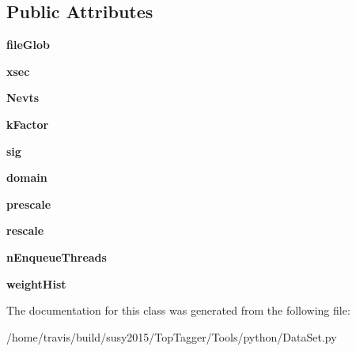 \subsection*{Public Attributes}
\begin{DoxyCompactItemize}
\item 
\hypertarget{classDataSet_1_1DataSet_a31312e7ebc75a63846784ead3f5cf8d1}{{\bfseries file\-Glob}}\label{classDataSet_1_1DataSet_a31312e7ebc75a63846784ead3f5cf8d1}

\item 
\hypertarget{classDataSet_1_1DataSet_ada08c6b544a58467403e9ab421057b5f}{{\bfseries xsec}}\label{classDataSet_1_1DataSet_ada08c6b544a58467403e9ab421057b5f}

\item 
\hypertarget{classDataSet_1_1DataSet_a69beaca98bb3ebb6061af614c70c5a80}{{\bfseries Nevts}}\label{classDataSet_1_1DataSet_a69beaca98bb3ebb6061af614c70c5a80}

\item 
\hypertarget{classDataSet_1_1DataSet_a6813ebb37a959a59becf21a06fda7e1f}{{\bfseries k\-Factor}}\label{classDataSet_1_1DataSet_a6813ebb37a959a59becf21a06fda7e1f}

\item 
\hypertarget{classDataSet_1_1DataSet_aadcca5cbd9d7962486695097ea39f34b}{{\bfseries sig}}\label{classDataSet_1_1DataSet_aadcca5cbd9d7962486695097ea39f34b}

\item 
\hypertarget{classDataSet_1_1DataSet_a10068706fbc43da752a9a839cdedff1a}{{\bfseries domain}}\label{classDataSet_1_1DataSet_a10068706fbc43da752a9a839cdedff1a}

\item 
\hypertarget{classDataSet_1_1DataSet_a483dac2804e4ea9d834d944ba9d5664e}{{\bfseries prescale}}\label{classDataSet_1_1DataSet_a483dac2804e4ea9d834d944ba9d5664e}

\item 
\hypertarget{classDataSet_1_1DataSet_ac5ea1a521dbffb539f7ccce804b64393}{{\bfseries rescale}}\label{classDataSet_1_1DataSet_ac5ea1a521dbffb539f7ccce804b64393}

\item 
\hypertarget{classDataSet_1_1DataSet_a290520ed790c13b0b0eb84a3530f9167}{{\bfseries n\-Enqueue\-Threads}}\label{classDataSet_1_1DataSet_a290520ed790c13b0b0eb84a3530f9167}

\item 
\hypertarget{classDataSet_1_1DataSet_afc8436a9d89b2ac89ca52552827303c3}{{\bfseries weight\-Hist}}\label{classDataSet_1_1DataSet_afc8436a9d89b2ac89ca52552827303c3}

\end{DoxyCompactItemize}


The documentation for this class was generated from the following file\-:\begin{DoxyCompactItemize}
\item 
/home/travis/build/susy2015/\-Top\-Tagger/\-Tools/python/Data\-Set.\-py\end{DoxyCompactItemize}
